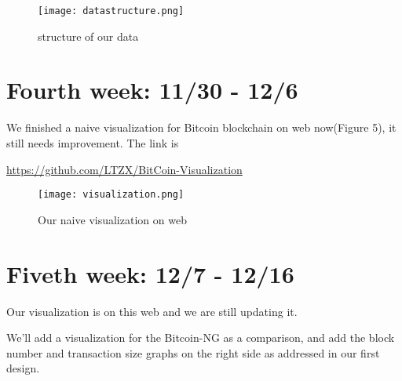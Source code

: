 \documentclass[a4paper]{article}
\begin{document}
\begin{figure}
\centering
\texttt{[image: datastructure.png]}
\caption{\label{fig:data}structure of our data}
\end{figure}

\section{Fourth week: 11/30 - 12/6}
We finished a naive visualization for Bitcoin blockchain on web now(Figure 5), it still needs improvement. The link is

\href{https://github.com/LTZX/BitCoin-Visualization}{https://github.com/LTZX/BitCoin-Visualization}

\begin{figure}
\centering
\texttt{[image: visualization.png]}
\caption{\label{fig:data}Our naive visualization on web}
\end{figure}

\section{Fiveth week: 12/7 - 12/16}
Our visualization is on this web and we are still updating it.

We'll add a visualization for the Bitcoin-NG as a comparison, and add the block number and transaction size graphs on the right side as addressed in our first design.
\end{document}
